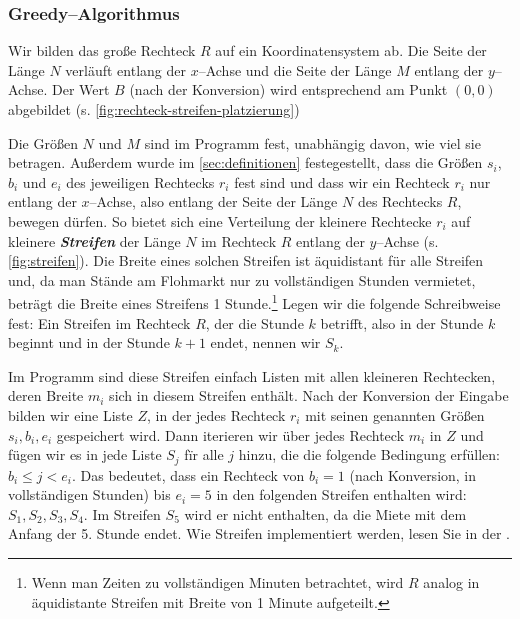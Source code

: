 \subsubsection{Greedy--Algorithmus}

Wir bilden das große Rechteck $R$ auf ein Koordinatensystem ab.
Die Seite der Länge $N$ verläuft entlang der $x$--Achse und die Seite der Länge
$M$ entlang der $y$--Achse.
Der Wert $B$ (nach der Konversion) wird entsprechend am Punkt $(0, 0)$ abgebildet (s. \cref{fig:rechteck-streifen-platzierung})

Die Größen $N$ und $M$ sind im Programm fest, unabhängig davon, wie viel sie betragen.
Außerdem wurde im \cref{sec:definitionen} festegestellt, dass die Größen $s_i$, $b_i$ und $e_i$
des jeweiligen Rechtecks $r_i$ fest sind und dass wir ein Rechteck $r_i$ nur entlang der $x$--Achse,
also entlang der Seite der Länge $N$ des Rechtecks $R$, bewegen dürfen.
So bietet sich eine Verteilung der kleinere Rechtecke $r_i$ auf kleinere \textit{\textbf{Streifen}}
der Länge $N$ im Rechteck $R$ entlang der $y$--Achse (s. \cref{fig:streifen}).
Die Breite eines solchen Streifen ist äquidistant für alle Streifen und, da
man Stände am Flohmarkt nur zu vollständigen Stunden vermietet, 
beträgt die Breite eines Streifens 1 Stunde.\footnote{Wenn man Zeiten zu
vollständigen Minuten betrachtet,
wird $R$ analog in äquidistante Streifen mit Breite von 1 Minute aufgeteilt.}
Legen wir die folgende Schreibweise fest: Ein Streifen im Rechteck $R$, der die
Stunde $k$ betrifft, also in der Stunde $k$ beginnt und in der Stunde $k+1$ endet, nennen wir $S_k$.


Im Programm sind diese Streifen einfach Listen mit allen kleineren Rechtecken, 
deren Breite $m_i$ sich in diesem Streifen enthält.
Nach der Konversion der Eingabe bilden wir eine Liste $Z$, in der jedes
Rechteck $r_i$ mit seinen genannten Größen $s_i, b_i, e_i$ gespeichert wird.
Dann iterieren wir über jedes Rechteck $m_i$ in $Z$ und fügen wir es in jede Liste $S_j$ fïr alle
$j$ hinzu, die die folgende Bedingung erfüllen: $b_i \leqslant j < e_i$.
Das bedeutet, dass ein Rechteck von $b_i = 1$ (nach Konversion, in vollständigen Stunden)
bis $e_i = 5$ in den folgenden Streifen enthalten wird: $S_1, S_2, S_3, S_4$. Im Streifen $S_5$
wird er nicht enthalten, da die Miete mit dem Anfang der 5. Stunde endet.
Wie Streifen implementiert werden, lesen Sie in der .


